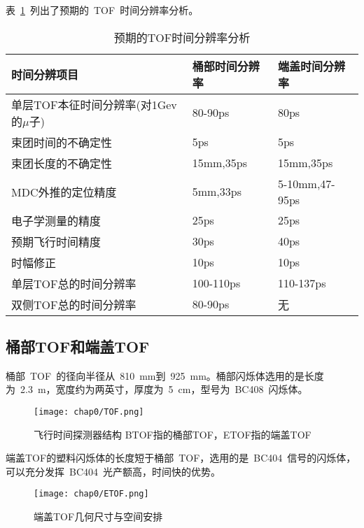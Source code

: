 表~\ref{tbl:TOF-expect-sigma}~列出了预期的~TOF~时间分辨率分析。
\begin{table}[h]
    \centering
    \caption{\label{tbl:TOF-expect-sigma} 预期的TOF时间分辨率分析}
    \footnotesize
    \begin{tabular}{lll}
        \hline
        时间分辨项目& 桶部时间分辨率& 端盖时间分辨率 \\
        \hline
        单层TOF本征时间分辨率(对1Gev的$\mu$子)& 80-90ps&        80ps \\
        束团时间的不确定性&                     5ps&            5ps \\
        束团长度的不确定性&                     15mm,35ps&      15mm,35ps\\
        MDC外推的定位精度&                      5mm,33ps&       5-10mm,47-95ps\\
        电子学测量的精度&                       25ps&           25ps\\
        预期飞行时间精度&                       30ps&           40ps\\
        时幅修正&                               10ps&          10ps  \\
		单层TOF总的时间分辨率&                   100-110ps&     110-137ps           \\
		双侧TOF总的时间分辨率&                   80-90ps&       无                \\       
        \hline
    \end{tabular}
\end{table}

\subsection{桶部TOF和端盖TOF}
桶部~TOF~的径向半径从~810~mm到~925~mm。桶部闪烁体选用的是长度为~2.3~m，宽度约为两英寸，厚度为~5~cm，型号为~BC408~闪烁体。
\begin{figure}[!h]
  \centering
  \texttt{[image: chap0/TOF.png]}
  \caption{飞行时间探测器结构 BTOF指的桶部TOF，ETOF指的端盖TOF}
  \label{fig:TOF}
\end{figure}

端盖TOF的塑料闪烁体的长度短于桶部~TOF，选用的是~BC404~信号的闪烁体，可以充分发挥~BC404~光产额高，时间快的优势。
\begin{figure}[!h]
  \centering
  \texttt{[image: chap0/ETOF.png]}
  \caption{端盖TOF几何尺寸与空间安排}
  \label{fig:ETOF}
\end{figure}
